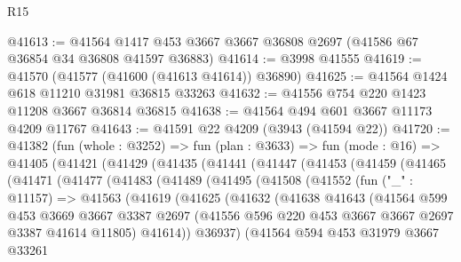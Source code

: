 \begin{lexlean}{R15}
\begin{coremodule}
@41613 := @41564 @1417 @453 @3667 @3667 @36808 @2697 (@41586 @67 @36854 @34 @36808 @41597 @36883)
@41614 := @3998 @41555
@41619 := @41570 (@41577 (@41600 (@41613 @41614)) @36890)
@41625 := @41564 @1424 @618 @11210 @31981 @36815 @33263
@41632 := @41556 @754 @220 @1423 @11208 @3667 @36814 @36815
@41638 := @41564 @494 @601 @3667 @11173 @4209 @11767
@41643 := @41591 @22 @4209 (@3943 (@41594 @22))
@41720 := @41382
    (fun (whole : @3252) =>
    fun (plan : @3633) =>
    fun (mode : @16) =>
    @41405
      (@41421
        (@41429
          (@41435
            (@41441
              (@41447
                (@41453
                  (@41459
                    (@41465
                      (@41471
                        (@41477
                          (@41483
                            (@41489
                              (@41495
                                (@41508
                                  (@41552
                                    (fun ("_" : @11157) =>
                                    @41563
                                      (@41619
                                        (@41625
                                          (@41632
                                            (@41638
                                              @41643
                                              (@41564
                                                @599
                                                @453
                                                @3669
                                                @3667
                                                @3387
                                                @2697
                                                (@41556
                                                  @596
                                                  @220
                                                  @453
                                                  @3667
                                                  @3667
                                                  @2697
                                                  @3387
                                                  @41614
                                                  @11805)
                                                @41614))
                                            @36937)
                                          (@41564
                                            @594
                                            @453
                                            @31979
                                            @3667
                                            @33261

\end{coremodule}
\end{lexlean}
